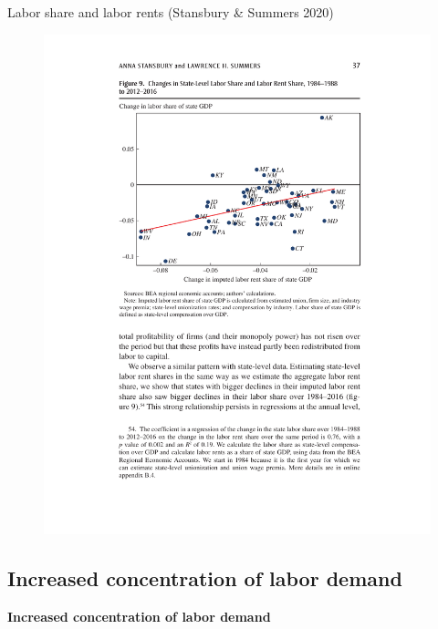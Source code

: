 \documentclass[notes=show]{beamer}
\begin{document}
\begin{frame}{Labor share and labor rents (Stansbury \& Summers 2020)}
\begin{figure}[p!]
 \includegraphics[width=.9\textwidth]{figure-SS-9.pdf} 
\end{figure}
\end{frame}

\subsection*{Increased concentration of labor demand}

\begin{frame}
	\centering
	\textbf{Increased concentration of labor demand}
\end{frame}
\end{document}
